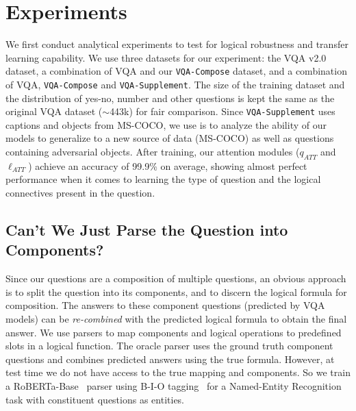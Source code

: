\section{Experiments}

We first conduct analytical experiments to test for logical robustness and transfer learning capability.
We use three datasets for our experiment: the VQA v2.0~\citep{antol2015vqa} dataset, a combination of VQA and our \texttt{VQA-Compose} dataset, and a combination of VQA, \texttt{VQA-Compose} and \texttt{VQA-Supplement}.
The size of the training dataset and the distribution of yes-no, number and other questions is kept the same as the original VQA dataset ($\sim$443k) for fair comparison.
Since \texttt{VQA-Supplement} uses captions and objects from MS-COCO, we use is to analyze the ability of our models to generalize to a new source of data (MS-COCO) as well as questions containing adversarial objects.
After training, our attention modules ($q_{\textit{ATT}}$ and $\ell_{\textit{ATT}}$) achieve an accuracy of 99.9\% on average, showing almost perfect performance when it comes to learning the type of question and the logical connectives present in the question.




    \subsection{Can't We Just Parse the Question into Components?}
    
    Since our questions are a composition of multiple questions, an obvious approach is to split the question into its components, and to discern the logical formula for composition.
    The answers to these component questions (predicted by VQA models) can be \textit{re-combined} with the predicted logical formula to obtain the final answer.
    We use parsers to map components and logical operations to predefined slots in a logical function.
    The oracle parser uses the ground truth component questions and combines predicted answers using the true formula.
    However, at test time we do not have access to the true mapping and components.
    So we train a RoBERTa-Base~\citep{liu2019roberta} parser using B-I-O tagging~\citep{ramshaw-marcus-1995-text} for a Named-Entity Recognition task with constituent questions as entities.\footnotemark[1]
    
